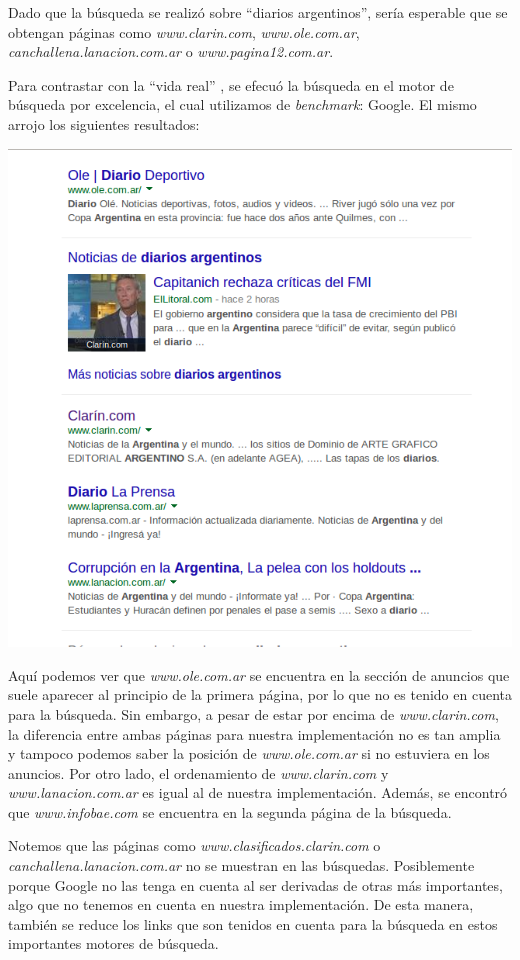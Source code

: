Dado que la búsqueda se realizó sobre ``diarios argentinos'', sería esperable que se obtengan páginas como \textit{www.clarin.com}, \textit{www.ole.com.ar}, \textit{canchallena.lanacion.com.ar} o \textit{www.pagina12.com.ar}.
\par 
Para contrastar con la ``vida real'' , se efecuó la búsqueda en el motor de búsqueda por excelencia, el cual utilizamos de \textit{benchmark}: Google.
El mismo arrojo los siguientes resultados:

	\par 
	\begin{center}
		\includegraphics[scale=0.5]{./img/primerapaginagoogle.png}
	\end{center}
	\par 

Aquí podemos ver que \textit{www.ole.com.ar} se encuentra en la sección de anuncios que suele aparecer al principio de la primera página, por lo que no es tenido en cuenta para la búsqueda. Sin embargo, a pesar de estar por encima de \textit{www.clarin.com}, la diferencia entre ambas páginas para nuestra implementación no es tan amplia y tampoco podemos saber la posición de \textit{www.ole.com.ar} si no estuviera en los anuncios. Por otro lado, el ordenamiento de \textit{www.clarin.com} y \textit{www.lanacion.com.ar} es igual al de nuestra implementación. Además, se encontró que \textit{www.infobae.com} se encuentra en la segunda página de la búsqueda. 
\par 
Notemos que las páginas como \textit{www.clasificados.clarin.com} o \textit{canchallena.lanacion.com.ar} no se muestran en las búsquedas. Posiblemente porque Google no las tenga en cuenta al ser derivadas de otras más importantes, algo que no tenemos en cuenta en nuestra implementación.  De esta manera, también se reduce los links que son tenidos en cuenta para la búsqueda en estos importantes motores de búsqueda.
\par 

